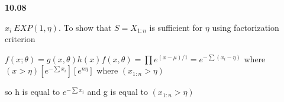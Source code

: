 
{\bf 10.08}

$x_{i} ~ EXP(1,\eta)$. To show that $S= X_{1:n}$ is sufficient for $\eta$ using factorization criterion 

$f(x;\theta) = g(x,\theta)h(x)

f(x,\theta) = \prod e^{(x-\mu)/1} = e^{-\sum(x_{i} - \eta)}$   where $(x> \eta)

 [e^{-\sum x_{i}}] [e^{n\eta}]$ where $(x_{1:n} > \eta)$

 so h is equal to $e^{-\sum x_{i}}$ and g is equal to $(x_{1:n} > \eta)  $ 
